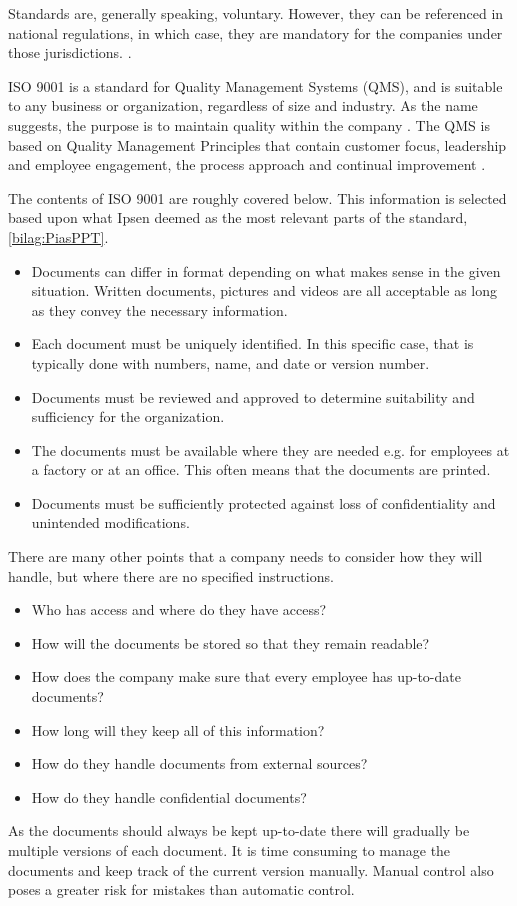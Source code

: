Standards are, generally speaking, voluntary.
However, they can be referenced in national regulations, in which case, they are mandatory for the companies under those jurisdictions. \cite{ISOreviewedevery5years}.

ISO 9001 is a standard for Quality Management Systems (QMS), and is suitable to any business or organization, regardless of size and industry.
As the name suggests, the purpose is to maintain quality within the company \cite{ISO9001}.
The QMS is based on Quality Management Principles that contain customer focus, leadership and employee engagement, the process approach and continual improvement \cite{ISO9001-2}.

The contents of ISO 9001 are roughly covered below.
This information is selected based upon what Ipsen deemed as the most relevant parts of the standard, \cref{bilag:PiasPPT}.

\begin{itemize}
	\item
	Documents can differ in format depending on what makes sense in the given situation.
	Written documents, pictures and videos are all acceptable as long as they convey the necessary information.
	\item
	Each document must be uniquely identified.
	In this specific case, that is typically done with numbers, name, and date or version number.
	\item
	Documents must be reviewed and approved to determine suitability and sufficiency for the organization.
	\item
	The documents must be available where they are needed e.g. for employees at a factory or at an office.
	This often means that the documents are printed.
	\item
	Documents must be sufficiently protected against loss of confidentiality and unintended modifications.
\end{itemize}

There are many other points that a company needs to consider how they will handle, but where there are no specified instructions.

\begin{itemize}
	\item Who has access and where do they have access?
	\item How will the documents be stored so that they remain readable?
	\item How does the company make sure that every employee has up-to-date documents?
	\item How long will they keep all of this information?
	\item How do they handle documents from external sources?
	\item How do they handle confidential documents?
\end{itemize}

As the documents should always be kept up-to-date there will gradually be multiple versions of each document.
It is time consuming to manage the documents and keep track of the current version manually.
Manual control also poses a greater risk for mistakes than automatic control.

